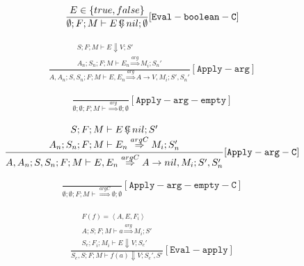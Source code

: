 \documentclass{scrartcl}
\DeclareMathOperator{\ceval}{\overset{C}{\smash{\Downarrow}}}
\begin{document}
    \begin{align*}
    \frac{
        E \in \{true, false\}
    }{
        \emptyset; F; M \vdash E  \ceval nil; \emptyset
    }[\mathtt{Eval-boolean-C}]
    \end{align*}
    
    \begin{align*}
    \frac{
        \begin{matrix}
        S; F; M \vdash E \Downarrow V; S' \\
        A_n; S_n; F; M \vdash E_n \overset{arg}{\Rightarrow} M_i; S_n'
        \end{matrix}
    }{
        A, A_n; S, S_n; F; M \vdash E, E_n \overset{arg}{\Rightarrow} A \to V, M_i; S', S_n'
    }[\mathtt{Apply-arg}]
    \end{align*}
    
    \begin{align*}
    \frac{}{
        \emptyset; \emptyset; F; M \vdash \overset{arg}{\Rightarrow} \emptyset; \emptyset
    }[\mathtt{Apply-arg-empty}]
    \end{align*}
    
    \begin{align*}
    \frac{
        \begin{matrix}
        S; F; M \vdash E  \ceval nil; S' \\
        A_n; S_n; F; M \vdash E_n \overset{argC}{\Rightarrow} M_i; S_n'
        \end{matrix}
    }{
        A, A_n; S, S_n; F; M \vdash E, E_n \overset{argC}{\Rightarrow} A \to nil, M_i; S', S_n'
    }[\mathtt{Apply-arg-C}]
    \end{align*}
    
    \begin{align*}
    \frac{}{
        \emptyset; \emptyset; F; M \vdash \overset{argC}{\Rightarrow} \emptyset; \emptyset
    }[\mathtt{Apply-arg-empty-C}]
    \end{align*}
    
    \begin{align*}
    \frac{
        \begin{matrix}
        F(f) = \left< A, E, F_i \right> \\
        A; S; F; M \vdash a \overset{arg}{\Rightarrow} M_i; S' \\
        S_e; F_i; M_i \vdash E \Downarrow V; S_e'
        \end{matrix}
    }{
        S_e, S; F; M \vdash f(a) \Downarrow V; S_e', S'
    }[\mathtt{Eval-apply}]
    \end{align*}
    
\end{document}
